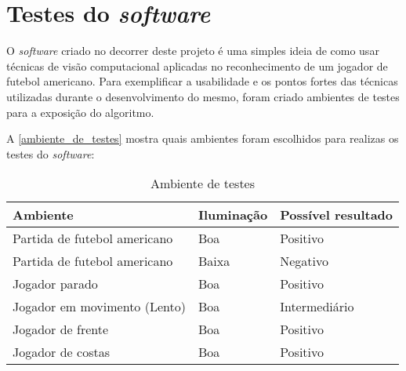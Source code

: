 \section{\textbf{Testes do \textit{software}}}
\label{ambientes-de-teste}

O \textit{software} criado no decorrer deste projeto é uma simples ideia de como usar técnicas de visão computacional aplicadas no reconhecimento de um jogador de futebol americano. Para exemplificar a usabilidade e os pontos fortes das técnicas utilizadas durante o desenvolvimento do mesmo, foram criado ambientes de testes para a exposição do algoritmo.

A \autoref{ambiente_de_testes} mostra quais ambientes foram escolhidos para realizas os testes do \textit{software}:

\begin{table}[!h]
\centering
\caption{Ambiente de testes}
\label{ambiente_de_testes}
\begin{tabular}{l|l|l} 
\hline
\hline
\multicolumn{1}{l|}{Ambiente} & Iluminação & \multicolumn{1}{l}{Possível resultado}  \\ 
\hline
Partida de futebol americano   & Boa        & Positivo                                 \\
Partida de futebol americano   & Baixa      & Negativo                                 \\
Jogador parado                 & Boa        & Positivo                                 \\
Jogador em movimento (Lento)   & Boa        & Intermediário                            \\
Jogador de frente              & Boa        & Positivo                                 \\
Jogador de costas              & Boa        & Positivo \\
\hline
\hline 
\end{tabular}
\end{table}